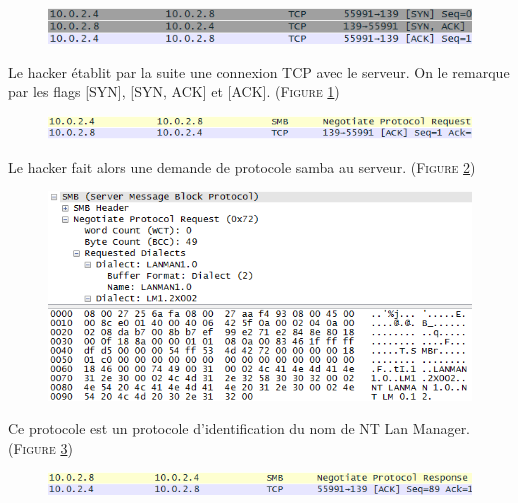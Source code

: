 \documentclass[11pt]{article}
\begin{document}
\vspace{1cm}
 \begin{figure}[h!]
        \centering \includegraphics[scale=1]{Exo3/3.png}
        \caption{}
         \label{fig:3}
\end{figure}

Le hacker établit par la suite une connexion TCP avec le serveur. On le remarque par les flags [SYN], [SYN, ACK] et [ACK]. (\textsc{Figure \ref{fig:3}})
\vspace{2cm}
 \begin{figure}[h!]
        \centering \includegraphics[scale=1]{Exo3/4.png}
        \caption{}
         \label{fig:4}
\end{figure}

Le hacker fait alors une demande de protocole samba au serveur. (\textsc{Figure \ref{fig:4}})
\vspace{2cm}
 \begin{figure}[h!]
        \centering \includegraphics[scale=1]{Exo3/5.png}
        \caption{}
         \label{fig:5}
\end{figure}

Ce protocole est un protocole d’identification du nom de NT Lan Manager. (\textsc{Figure \ref{fig:5}})
\vspace{2cm}
 \begin{figure}[h!]
        \centering \includegraphics[scale=1]{Exo3/6.png}
        \caption{}
         \label{fig:6}
\end{figure}
\end{document}
